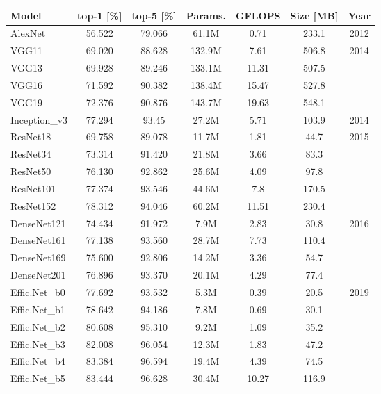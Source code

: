 \begin{table}[h]
    \centering
    \begin{tabular}{l|c|c|c|c|c|c}
        \hline
        \textbf{Model} & \textbf{top-1 [\%]} & \textbf{top-5 [\%]} & 
        \textbf{Params.} & \textbf{GFLOPS} & \textbf{Size [MB]} & 
        \textbf{Year} \\
        \hline
        AlexNet & 56.522 & 79.066 & 61.1M & 0.71 & 233.1 & 2012 \\
        \hline
        VGG11 & 69.020 & 88.628 & 132.9M & 7.61 & 506.8 & 2014 \\
        VGG13 & 69.928 & 89.246 & 133.1M & 11.31 & 507.5 & \\
        VGG16 & 71.592 & 90.382 & 138.4M & 15.47 & 527.8 & \\
        VGG19 & 72.376 & 90.876 & 143.7M & 19.63 & 548.1 & \\
        \hline
        Inception\_v3 & 77.294 & 93.45 & 27.2M & 5.71 & 103.9 & 2014 \\
        \hline
        ResNet18 & 69.758 & 89.078 & 11.7M & 1.81 & 44.7 & 2015 \\
        ResNet34 & 73.314 & 91.420 & 21.8M & 3.66 & 83.3 & \\
        ResNet50 & 76.130 & 92.862 & 25.6M & 4.09 & 97.8 & \\
        ResNet101 & 77.374 & 93.546 & 44.6M & 7.8 & 170.5 & \\
        ResNet152 & 78.312 & 94.046 & 60.2M & 11.51 & 230.4 & \\
        \hline
        DenseNet121 & 74.434 & 91.972 & 7.9M & 2.83 & 30.8 & 2016 \\
        DenseNet161 & 77.138 & 93.560 & 28.7M & 7.73 & 110.4 & \\
        DenseNet169 & 75.600 & 92.806 & 14.2M & 3.36 & 54.7 & \\
        DenseNet201 & 76.896 & 93.370 & 20.1M & 4.29 & 77.4 & \\
        \hline
        Effic.Net\_b0 & 77.692 & 93.532 & 5.3M & 0.39 & 20.5 & 2019 \\
        Effic.Net\_b1 & 78.642 & 94.186 & 7.8M & 0.69 & 30.1 & \\
        Effic.Net\_b2 & 80.608 & 95.310 & 9.2M & 1.09 & 35.2 & \\
        Effic.Net\_b3 & 82.008 & 96.054 & 12.3M & 1.83 & 47.2 & \\
        Effic.Net\_b4 & 83.384 & 96.594 & 19.4M & 4.39 & 74.5 & \\
        Effic.Net\_b5 & 83.444 & 96.628 & 30.4M & 10.27 & 116.9 & \\

\end{tabular}
\end{table}
